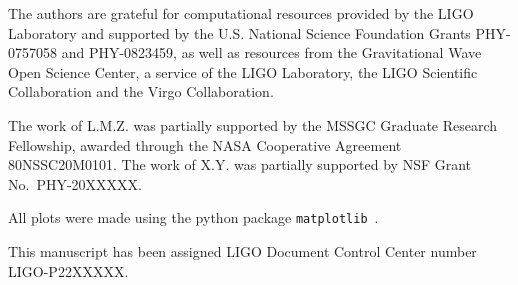 \documentclass[aps,prd,twocolumn,superscriptaddress,preprintnumbers,floatfix,nofootinbib]{revtex4-2}
\begin{document}
The authors are grateful for computational resources provided by the LIGO 
Laboratory and supported by the U.S. National Science Foundation Grants 
PHY-0757058 and PHY-0823459, as well as resources from the Gravitational Wave
Open Science Center, a service of the LIGO Laboratory, the LIGO Scientific 
Collaboration and the Virgo Collaboration.
%

The work of L.M.Z. was partially supported by the MSSGC Graduate
Research Fellowship, awarded through the NASA Cooperative Agreement
80NSSC20M0101. 
%
The work of X.Y. was partially supported by NSF Grant No.~PHY-20XXXXX.
%

All plots were made using the python package \texttt{matplotlib}~\cite{Hunter:2007ouj}.

This manuscript has been assigned LIGO Document Control Center number LIGO-P22XXXXX.

\def\bibsection{\section*{References}}


\end{document}
